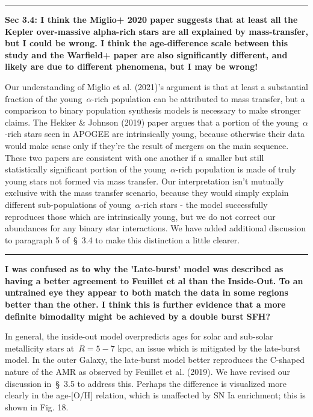 \documentclass{report}
\newcommand{\breakline}{\noindent\rule{\textwidth}{1pt}}
\begin{document}
\par\null\par 
\breakline 
\par\null\par 
\textbf{
	Sec 3.4: I think the Miglio+ 2020 paper suggests that at least all the 
	Kepler over-massive alpha-rich stars are all explained by mass-transfer, 
	but I could be wrong. 
	I think the age-difference scale between this study and the Warfield+ paper 
	are also significantly different, and likely are due to different 
	phenomena, but I may be wrong! 
} 
\par 
Our understanding of Miglio et al. (2021)'s argument is that at least a 
substantial fraction of the young~$\alpha$-rich population can be attributed 
to mass transfer, but a comparison to binary population synthesis models is 
necessary to make stronger claims. 
The Hekker \& Johnson (2019) paper argues that a portion of the 
young~$\alpha$-rich stars seen in APOGEE are intrinsically young, because 
otherwise their data would make sense only if they're the result of mergers on 
the main sequence. 
These two papers are consistent with one another if a smaller but still 
statistically significant portion of the young~$\alpha$-rich population is made 
of truly young stars not formed via mass transfer. 
Our interpretation isn't mutually exclusive with the mass transfer scenario, 
because they would simply explain different sub-populations of 
young~$\alpha$-rich stars - the model successfully reproduces those which are 
intrinsically young, but we do not correct our abundances for any binary star 
interactions. 
We have added additional discussion to paragraph 5 of~\S~3.4 to make this 
distinction a little clearer. 

\par\null\par 
\breakline 
\par\null\par 
\textbf{
	I was confused as to why the 'Late-burst' model was described as having a 
	better agreement to Feuillet et al than the Inside-Out. 
	To an untrained eye they appear to both match the data in some regions 
	better than the other. 
	I think this is further evidence that a more definite bimodality might be 
	achieved by a double burst SFH? 
} 
\par 
In general, the inside-out model overpredicts ages for solar and sub-solar 
metallicity stars at~$R = 5 - 7$ kpc, an issue which is mitigated by the 
late-burst model. 
In the outer Galaxy, the late-burst model better reproduces the C-shaped nature 
of the AMR as observed by Feuillet et al. (2019). 
We have revised our discussion in~\S~3.5 to address this. 
Perhaps the difference is visualized more clearly in the age-[O/H] relation, 
which is unaffected by SN Ia enrichment; this is shown in Fig. 18. 
\end{document}
